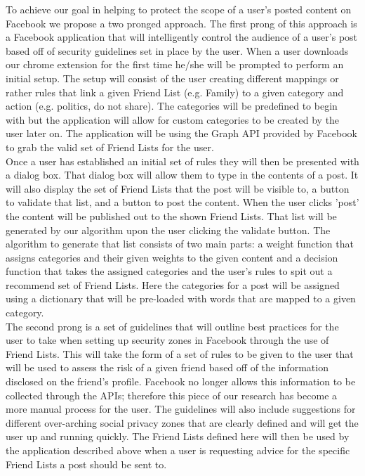 \tab To achieve our goal in helping to protect the scope of a user's posted content on Facebook we propose a two pronged approach. The first prong of this approach is a Facebook application that will intelligently control the audience of a user's post based off of security guidelines set in place by the user. When a user downloads our chrome extension for the first time he/she will be prompted to perform an initial setup. The setup will consist of the user creating different mappings or rather rules that link a given Friend List (e.g. Family) to a given category and action (e.g. politics, do not share). The categories will be predefined to begin with but the application will allow for custom categories to be created by the user later on. The application will be using the Graph API provided by Facebook to grab the valid set of Friend Lists for the user\cite{weaver2013facebook}.
\\
\tab Once a user has established an initial set of rules they will then be presented with a dialog box. That dialog box will allow them to type in the contents of a post. It will also display the set of Friend Lists that the post will be visible to, a button to validate that list, and a button to post the content. When the user clicks 'post' the content will be published out to the shown Friend Lists. That list will be generated by our algorithm upon the user clicking the validate button. The algorithm to generate that list consists of two main parts: a weight function that assigns categories and their given weights to the given content and a decision function that takes the assigned categories and the user's rules to spit out a recommend set of Friend Lists. Here the categories for a post will be assigned using a dictionary that will be pre-loaded with words that are mapped to a given category.
\\
\tab The second prong is a set of guidelines that will outline best practices for the user to take when setting up security zones in Facebook through the use of Friend Lists. This will take the form of a set of rules to be given to the user that will be used to assess the risk of a given friend based off of the information disclosed on the friend's profile\cite{ghazinour2016yourprivacyprotector}. Facebook no longer allows this information to be collected through the APIs; therefore this piece of our research has become a more manual process for the user. The guidelines will also include suggestions for different over-arching social privacy zones that are clearly defined and will get the user up and running quickly. The Friend Lists defined here will then be used by the application described above when a user is requesting advice for the specific Friend Lists a post should be sent to. 
